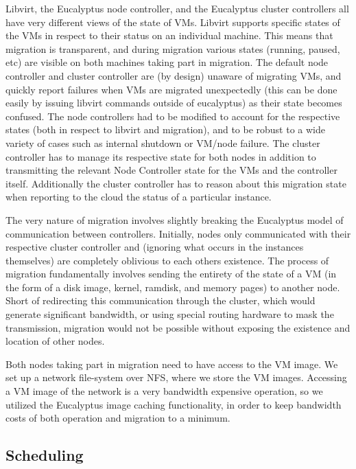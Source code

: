 Libvirt, the Eucalyptus node controller, and the Eucalyptus cluster controllers
all have very different views of the state of VMs.  Libvirt supports specific
states of the VMs in respect to their status on an individual machine. This
means that migration is transparent, and during migration various states
(running, paused, etc) are visible on both machines taking part in migration.
The default node controller and cluster controller are (by design) unaware of
migrating VMs, and quickly report failures when VMs are migrated unexpectedly
(this can be done easily by issuing libvirt commands outside of eucalyptus) as
their state becomes confused.  The node controllers had to be modified to
account for the respective states (both in respect to libvirt and migration),
and to be robust to a wide variety of cases such as internal shutdown or VM/node
failure.  The cluster controller has to manage its respective state for both
nodes in addition to transmitting the relevant Node Controller state for the VMs
and the controller itself.  Additionally the cluster controller has to reason
about this migration state when reporting to the cloud the status of a
particular instance.

The very nature of migration involves slightly breaking the Eucalyptus model of
communication between controllers.  Initially, nodes only communicated with
their respective cluster controller and (ignoring what occurs in the instances
themselves) are completely oblivious to each others existence.  The process of
migration fundamentally involves sending the entirety of the state of a VM (in
the form of a disk image, kernel, ramdisk, and memory pages) to another node.
Short of redirecting this communication through the cluster, which would
generate significant bandwidth, or using special routing hardware to mask the
transmission, migration would not be possible without exposing the existence and
location of other nodes.

Both nodes taking part in migration need to have access to the VM image.  We set
up a network file-system over NFS, where we store the VM images.  Accessing a VM
image of the network is a very bandwidth expensive operation, so we utilized the
Eucalyptus image caching functionality, in order to keep bandwidth costs of both
operation and migration to a minimum.

\subsection{Scheduling}

